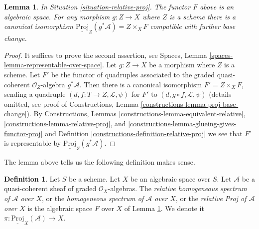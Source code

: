 \documentclass{stacks-project}
\theoremstyle{plain}
\newtheorem{lemma}[subsection]{Lemma}
\theoremstyle{definition}
\newtheorem{definition}[subsection]{Definition}
\theoremstyle{remark}
\numberwithin{equation}{subsection}
\begin{document}
\begin{lemma}
\label{lemma-relative-proj}
In Situation \ref{situation-relative-proj}. The functor $F$ above is an
algebraic space. For any morphism $g : Z \to X$ where $Z$ is a scheme
there is a canonical isomorphism
$\underline{\text{Proj}}_Z(g^*\mathcal{A}) = Z \times_X F$
compatible with further base change.
\end{lemma}

\begin{proof}
It suffices to prove the second assertion, see
Spaces, Lemma \ref{spaces-lemma-representable-over-space}.
Let $g : Z \to X$ be a morphism where $Z$ is a scheme.
Let $F'$ be the functor of quadruples associated
to the graded quasi-coherent $\mathcal{O}_Z$-algebra $g^*\mathcal{A}$.
Then there is a canonical isomorphism $F' = Z \times_X F$, sending
a quadruple $(d, f : T \to Z, \mathcal{L}, \psi)$ for $F'$
to $(d, g \circ f, \mathcal{L}, \psi)$ (details omitted, see proof of
Constructions, Lemma \ref{constructions-lemma-proj-base-change}).
By Constructions, Lemmas
\ref{constructions-lemma-equivalent-relative},
\ref{constructions-lemma-relative-proj}, and
\ref{constructions-lemma-glueing-gives-functor-proj} and
Definition \ref{constructions-definition-relative-proj}
we see that $F'$ is representable by
$\underline{\text{Proj}}_Z(g^*\mathcal{A})$.
\end{proof}

\noindent
The lemma above tells us the following definition makes sense.

\begin{definition}
\label{definition-relative-proj}
Let $S$ be a scheme. Let $X$ be an algebraic space over $S$.
Let $\mathcal{A}$ be a quasi-coherent sheaf of
graded $\mathcal{O}_X$-algebras. The
{\it relative homogeneous spectrum of $\mathcal{A}$ over $X$},
or the {\it homogeneous spectrum of $\mathcal{A}$ over $X$}, or the
{\it relative Proj of $\mathcal{A}$ over $X$} is the algebraic space
$F$ over $X$ of Lemma \ref{lemma-relative-proj}.
We denote it $\pi : \underline{\text{Proj}}_X(\mathcal{A}) \to X$.
\end{definition}
\end{document}
